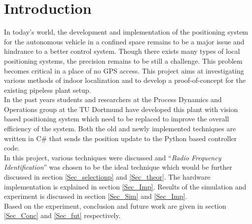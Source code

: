 \section{Introduction}

In today\textquoteright s world, the development and implementation of the positioning system for the autonomous vehicle in a confined space remains to be a major issue and hindrance to a better control system. Though there exists many types of local positioning systems, the precision remains to be still a challenge. This problem becomes critical in a place of no GPS access.
This project aims at investigating various methods of indoor localization and to develop a proof-of-concept for the existing pipeless plant setup. \\

In the past years students and researchers at the Process Dynamics and Operations group at the TU Dortmund have developed this plant with vision based positioning system which need to be replaced to improve the overall efficiency of the system. Both the old and newly implemented techniques are written in C\# that sends the position update to the Python based controller code.\\

In this project, various techniques were discussed and ``\textit{Radio Frequency Identification}'' was chosen to be the ideal technique which would be further discussed in section \ref{Sec_selectionp} and \ref{Sec_theor}. The hardware implementation is explained in section \ref{Sec_Imp}. Results of the simulation and experiment is discussed in section \ref{Sec_Sim} and \ref{Sec_Imp}.\\

 Based on the experiment, conclusion and future work are given in section \ref{Sec_Conc} and \ref{Sec_fut} respectively.






